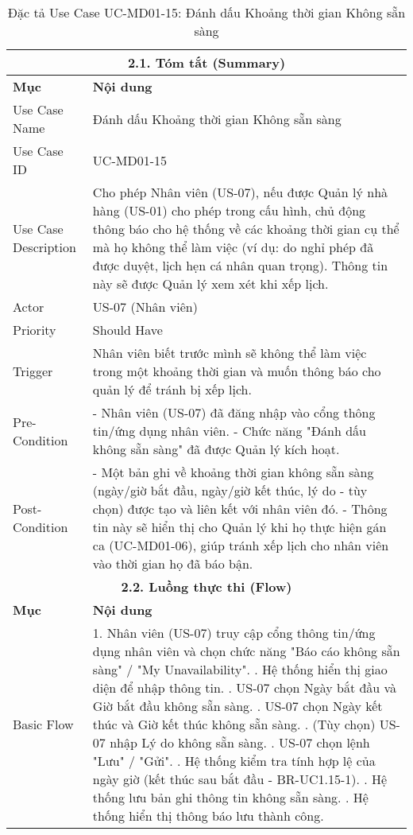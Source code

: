 \begin{longtable}{|m{4cm}|p{11cm}|}
\caption{Đặc tả Use Case UC-MD01-15: Đánh dấu Khoảng thời gian Không sẵn sàng} \label{tab:uc_md01_15_revised} \\
\hline
\multicolumn{2}{|c|}{\textbf{2.1. Tóm tắt (Summary)}} \\
\hline
\textbf{Mục} & \textbf{Nội dung} \\
\hline
\endhead %
\hline
\endfoot %
\hline
\endlastfoot %
Use Case Name & Đánh dấu Khoảng thời gian Không sẵn sàng \\
\hline
Use Case ID & UC-MD01-15 \\
\hline
Use Case Description & Cho phép Nhân viên (US-07), nếu được Quản lý nhà hàng (US-01) cho phép trong cấu hình, chủ động thông báo cho hệ thống về các khoảng thời gian cụ thể mà họ không thể làm việc (ví dụ: do nghỉ phép đã được duyệt, lịch hẹn cá nhân quan trọng). Thông tin này sẽ được Quản lý xem xét khi xếp lịch. \\
\hline
Actor & US-07 (Nhân viên) \\
\hline
Priority & Should Have \\
\hline
Trigger & Nhân viên biết trước mình sẽ không thể làm việc trong một khoảng thời gian và muốn thông báo cho quản lý để tránh bị xếp lịch. \\
\hline
Pre-Condition & - Nhân viên (US-07) đã đăng nhập vào cổng thông tin/ứng dụng nhân viên. \newline - Chức năng "Đánh dấu không sẵn sàng" đã được Quản lý kích hoạt. \\
\hline
Post-Condition & - Một bản ghi về khoảng thời gian không sẵn sàng (ngày/giờ bắt đầu, ngày/giờ kết thúc, lý do - tùy chọn) được tạo và liên kết với nhân viên đó. \newline - Thông tin này sẽ hiển thị cho Quản lý khi họ thực hiện gán ca (UC-MD01-06), giúp tránh xếp lịch cho nhân viên vào thời gian họ đã báo bận. \\
\hline
\multicolumn{2}{|c|}{\textbf{2.2. Luồng thực thi (Flow)}} \\
\hline
\textbf{Mục} & \textbf{Nội dung} \\
\hline
Basic Flow & 1. Nhân viên (US-07) truy cập cổng thông tin/ứng dụng nhân viên và chọn chức năng "Báo cáo không sẵn sàng" / "My Unavailability". \newline 2. Hệ thống hiển thị giao diện để nhập thông tin. \newline 3. US-07 chọn Ngày bắt đầu và Giờ bắt đầu không sẵn sàng. \newline 4. US-07 chọn Ngày kết thúc và Giờ kết thúc không sẵn sàng. \newline 5. (Tùy chọn) US-07 nhập Lý do không sẵn sàng. \newline 6. US-07 chọn lệnh "Lưu" / "Gửi". \newline 7. Hệ thống kiểm tra tính hợp lệ của ngày giờ (kết thúc sau bắt đầu - BR-UC1.15-1). \newline 8. Hệ thống lưu bản ghi thông tin không sẵn sàng. \newline 9. Hệ thống hiển thị thông báo lưu thành công. \\

\end{longtable}
